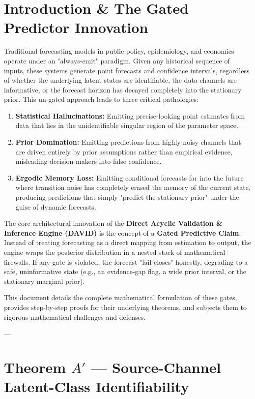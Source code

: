 \documentclass[11pt,a4paper]{article}
\begin{document}
\section{Introduction \& The Gated Predictor Innovation}
Traditional forecasting models in public policy, epidemiology, and economics operate under an "always-emit" paradigm. Given any historical sequence of inputs, these systems generate point forecasts and confidence intervals, regardless of whether the underlying latent states are identifiable, the data channels are informative, or the forecast horizon has decayed completely into the stationary prior. This un-gated approach leads to three critical pathologies:
\begin{enumerate}
    \item \textbf{Statistical Hallucinations:} Emitting precise-looking point estimates from data that lies in the unidentifiable singular region of the parameter space.
    \item \textbf{Prior Domination:} Emitting predictions from highly noisy channels that are driven entirely by prior assumptions rather than empirical evidence, misleading decision-makers into false confidence.
    \item \textbf{Ergodic Memory Loss:} Emitting conditional forecasts far into the future where transition noise has completely erased the memory of the current state, producing predictions that simply "predict the stationary prior" under the guise of dynamic forecasts.
\end{enumerate}

The core architectural innovation of the \textbf{Direct Acyclic Validation \& Inference Engine (DAVID)} is the concept of a \textbf{Gated Predictive Claim}. Instead of treating forecasting as a direct mapping from estimation to output, the engine wraps the posterior distribution in a nested stack of mathematical firewalls. If any gate is violated, the forecast "fail-closes" honestly, degrading to a safe, uninformative state (e.g., an evidence-gap flag, a wide prior interval, or the stationary marginal prior).

This document details the complete mathematical formulation of these gates, provides step-by-step proofs for their underlying theorems, and subjects them to rigorous mathematical challenges and defenses.

---

\section{Theorem $A'$ --- Source-Channel Latent-Class Identifiability}
\end{document}
